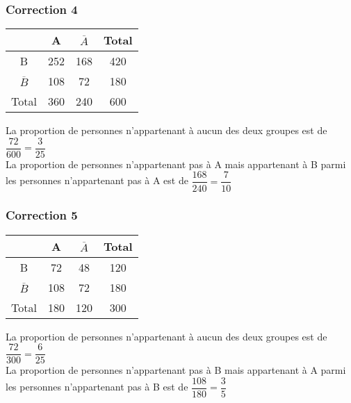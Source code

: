 \documentclass[15pt, mathserif]{beamer}
\begin{document}
\begin{frame}
\vspace{-10mm}
	\frametitle{Correction 4}
\begin{center} 
 \begin{tabular}{|c|c|c|c|} 
 \cline{2-4} 
 \multicolumn{1}{c|}{} & A & $\overline{A}$ & Total \\\hline 
 B   &252  &168& 420 \\\hline 
 $\overline{B}$   &108 & 72 & 180 \\\hline 
 Total   &360&240 &600 \\\hline  
 \end{tabular} 
 \end{center}
 La proportion de personnes n'appartenant à aucun des deux groupes est de $\dfrac{72}{600 }= \dfrac{3}{25}$
 \\ La proportion de personnes n'appartenant pas à A mais appartenant à B parmi les personnes n'appartenant pas à A est de $\dfrac{168}{240 }= \dfrac{7}{10}$
\end{frame}


\begin{frame}
\vspace{-10mm}
	\frametitle{Correction 5}
\begin{center} 
 \begin{tabular}{|c|c|c|c|} 
 \cline{2-4} 
 \multicolumn{1}{c|}{} & A & $\overline{A}$ & Total \\\hline 
 B   &72  &48& 120 \\\hline 
 $\overline{B}$   &108 & 72 & 180 \\\hline 
 Total   &180&120 &300 \\\hline  
 \end{tabular} 
 \end{center}
 La proportion de personnes n'appartenant à aucun des deux groupes est de $\dfrac{72}{300 }= \dfrac{6}{25}$
 \\ La proportion de personnes n'appartenant pas à B mais appartenant à A parmi les personnes n'appartenant pas à B est de $\dfrac{108}{180 }= \dfrac{3}{5}$
\end{frame}
\end{document}
